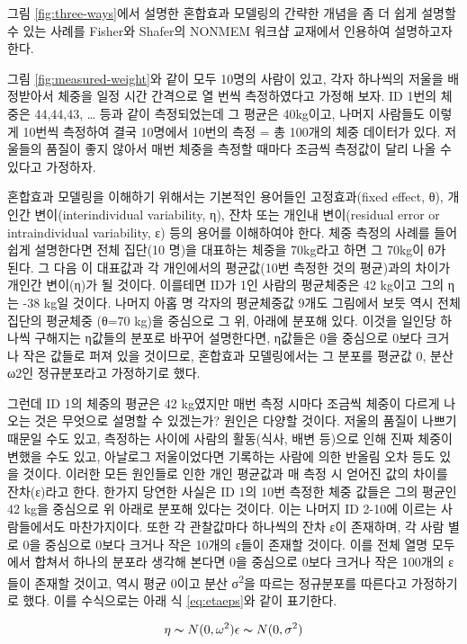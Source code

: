 \documentclass[
  10pt,
]{krantz}
\begin{document}
그림 \ref{fig:three-ways}에서 설명한 혼합효과 모델링의 간략한 개념을 좀 더 쉽게 설명할 수 있는 사례를 Fisher와 Shafer의 NONMEM 워크샵 교재에서 인용하여 설명하고자 한다.

그림 \ref{fig:measured-weight}와 같이 모두 10명의 사람이 있고, 각자 하나씩의 저울을 배정받아서 체중을 일정 시간 간격으로 열 번씩 측정하였다고 가정해 보자. ID 1번의 체중은 44,44,43, \ldots{} 등과 같이 측정되었는데 그 평균은 40kg이고, 나머지 사람들도 이렇게 10번씩 측정하여 결국 10명에서 10번의 측정 = 총 100개의 체중 데이터가 있다. 저울들의 품질이 좋지 않아서 매번 체중을 측정할 때마다 조금씩 측정값이 달리 나올 수 있다고 가정하자.

혼합효과 모델링을 이해하기 위해서는 기본적인 용어들인 고정효과(fixed effect, θ), 개인간 변이(interindividual variability, η), 잔차 또는 개인내 변이(residual error or intraindividual variability, ε) 등의 용어를 이해하여야 한다. 체중 측정의 사례를 들어 쉽게 설명한다면 전체 집단(10 명)을 대표하는 체중을 70kg라고 하면 그 70kg이 θ가 된다. 그 다음 이 대표값과 각 개인에서의 평균값(10번 측정한 것의 평균)과의 차이가 개인간 변이(η)가 될 것이다. 이를테면 ID가 1인 사람의 평균체중은 42 kg이고 그의 η는 -38 kg일 것이다. 나머지 아홉 명 각자의 평균체중값 9개도 그림에서 보듯 역시 전체 집단의 평균체중 (θ=70 kg)을 중심으로 그 위, 아래에 분포해 있다. 이것을 일인당 하나씩 구해지는 η값들의 분포로 바꾸어 설명한다면, η값들은 0을 중심으로 0보다 크거나 작은 값들로 퍼져 있을 것이므로, 혼합효과 모델링에서는 그 분포를 평균값 0, 분산 ω2인 정규분포라고 가정하기로 했다.

그런데 ID 1의 체중의 평균은 42 kg였지만 매번 측정 시마다 조금씩 체중이 다르게 나오는 것은 무엇으로 설명할 수 있겠는가? 원인은 다양할 것이다. 저울의 품질이 나쁘기 때문일 수도 있고, 측정하는 사이에 사람의 활동(식사, 배변 등)으로 인해 진짜 체중이 변했을 수도 있고, 아날로그 저울이었다면 기록하는 사람에 의한 반올림 오차 등도 있을 것이다. 이러한 모든 원인들로 인한 개인 평균값과 매 측정 시 얻어진 값의 차이를 잔차(ε)라고 한다. 한가지 당연한 사실은 ID 1의 10번 측정한 체중 값들은 그의 평균인 42 kg을 중심으로 위 아래로 분포해 있다는 것이다. 이는 나머지 ID 2-10에 이르는 사람들에서도 마찬가지이다. 또한 각 관찰값마다 하나씩의 잔차 ε이 존재하며, 각 사람 별로 0을 중심으로 0보다 크거나 작은 10개의 ε들이 존재할 것이다. 이를 전체 열명 모두에서 합쳐서 하나의 분포라 생각해 본다면 0을 중심으로 0보다 크거나 작은 100개의 ε들이 존재할 것이고, 역시 평균 0이고 분산 σ\textsuperscript{2}을 따르는 정규분포를 따른다고 가정하기로 했다. 이를 수식으로는 아래 식 \eqref{eq:etaeps}와 같이 표기한다.

\begin{equation} 
  \eta \thicksim N (0, \omega^2) \newline
  \epsilon \thicksim N (0, \sigma^2)
  \label{eq:etaeps}
\end{equation}
\end{document}

